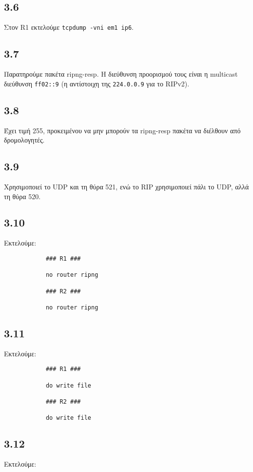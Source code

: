 \documentclass[a4paper, 12pt]{article}
\begin{document}
	\subsection*{3.6}
		Στον R1 εκτελούμε \verb|tcpdump -vni em1 ip6|.

	\subsection*{3.7}
		Παρατηρούμε πακέτα ripng-resp. Η διεύθυνση προορισμού τους είναι η multicast διεύθυνση \verb|ff02::9| (η αντίστοιχη της \verb|224.0.0.9| για το RIPv2).

	\subsection*{3.8}
		Έχει τιμή 255, προκειμένου να μην μπορούν τα ripng-resp πακέτα να διέλθουν από δρομολογητές.

	\subsection*{3.9}
		Χρησιμοποιεί το UDP και τη θύρα 521, ενώ το RIP χρησιμοποιεί πάλι το UDP, αλλά τη θύρα 520.

	\subsection*{3.10}
		Εκτελούμε:
		
		\begin{verbatim}
			### R1 ###
			
			no router ripng
			
			### R2 ###
			
			no router ripng
		\end{verbatim}

	\subsection*{3.11}
		Εκτελούμε:
		
		\begin{verbatim}
			### R1 ###
			
			do write file
			
			### R2 ###
			
			do write file
		\end{verbatim}

	\subsection*{3.12}
		Εκτελούμε:
		
\end{document}
